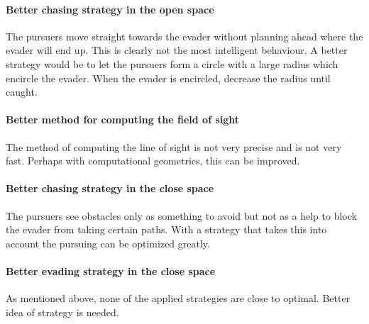 \documentclass[ebook,11pt] {kth-mag}
\begin{document}
\paragraph{Better chasing strategy in the open space}
The pursuers move straight towards the evader without planning ahead where the evader will end up. This is clearly not the most intelligent behaviour. A better strategy would be to let the pursuers form a circle with a large radius which encircle  the evader. When the evader is encircled, decrease the radius until caught. 

\paragraph{Better method for computing the field of sight}
The method of computing the line of sight is not very precise and is not very fast. Perhaps with computational geometrics, this can be improved. 

\paragraph{Better chasing strategy in the close space}
The pursuers see obstacles only as something to avoid but not as a help to block the evader from taking certain paths. With a strategy that takes this into account the pursuing can be optimized greatly. 

\paragraph{Better evading strategy in the close space}
As mentioned above, none of the applied strategies are close to optimal. Better idea of strategy is needed. 
\end{document}
